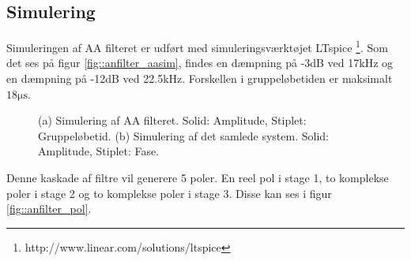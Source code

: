 \subsection{Simulering}
Simuleringen af AA filteret er udført med simuleringsværktøjet LTspice \footnote{http://www.linear.com/solutions/ltspice}. Som det ses på figur \ref{fig::anfilter_aasim}, findes en dæmpning på -3dB ved 17kHz og en dæmpning på -12dB ved 22.5kHz. Forskellen i gruppeløbetiden er maksimalt $18 \si{\micro \second}$.

\begin{figure}[h!]
	\centering
	\caption{(a) Simulering af AA filteret. Solid: Amplitude, Stiplet: Gruppeløbetid. \newline (b) Simulering af det samlede system. Solid: Amplitude, Stiplet: Fase.}
\end{figure}
\FloatBlock
Denne kaskade af filtre vil generere 5 poler. En reel pol i stage 1, to komplekse poler i stage 2 og to komplekse poler i stage 3. Disse kan ses i figur \ref{fig::anfilter_pol}.

